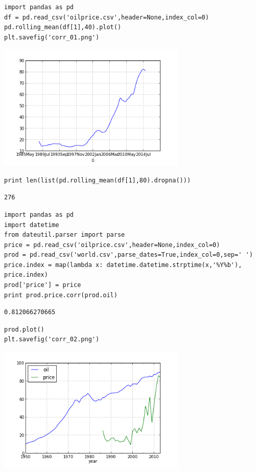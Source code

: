 \documentclass[12pt,fleqn]{article}\usepackage{../common}
\begin{document}
\begin{verbatim}
import pandas as pd
df = pd.read_csv('oilprice.csv',header=None,index_col=0)
pd.rolling_mean(df[1],40).plot()
plt.savefig('corr_01.png')
\end{verbatim}

\includegraphics[height=6cm]{corr_01.png}

\begin{verbatim}
print len(list(pd.rolling_mean(df[1],80).dropna()))
\end{verbatim}

\begin{verbatim}
276
\end{verbatim}

\begin{verbatim}
import pandas as pd
import datetime
from dateutil.parser import parse
price = pd.read_csv('oilprice.csv',header=None,index_col=0)
prod = pd.read_csv('world.csv',parse_dates=True,index_col=0,sep=' ')
price.index = map(lambda x: datetime.datetime.strptime(x,'%Y%b'), price.index)
prod['price'] = price
print prod.price.corr(prod.oil)
\end{verbatim}

\begin{verbatim}
0.812066270665
\end{verbatim}

\begin{verbatim}
prod.plot()
plt.savefig('corr_02.png')
\end{verbatim}

\includegraphics[height=6cm]{corr_02.png}
\end{document}
